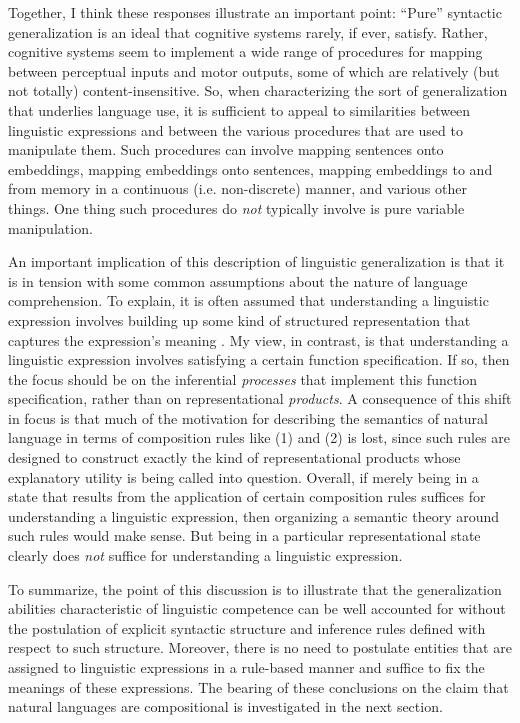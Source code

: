 Together, I think these responses illustrate an important point: ``Pure'' syntactic generalization \citep[][p. 151]{Eliasmith:2013} is an ideal that cognitive systems rarely, if ever, satisfy. Rather, cognitive systems seem to implement a wide range of procedures for mapping between perceptual inputs and motor outputs, some of which are relatively (but not totally) content-insensitive. So, when characterizing the sort of generalization that underlies language use, it is sufficient to appeal to similarities between linguistic expressions and between the various procedures that are used to manipulate them. Such procedures can involve mapping sentences onto embeddings, mapping embeddings onto sentences, mapping embeddings to and from memory in a continuous (i.e. non-discrete) manner, and various other things. One thing such procedures do \textit{not} typically involve is pure variable manipulation. 

An important implication of this description of linguistic generalization is that it is in tension with some common assumptions about the nature of language comprehension. To explain, it is often assumed that understanding a linguistic expression involves building up some kind of structured representation that captures the expression's meaning \citep[see e.g.][]{SmolenskyLegendre:2006}. My view, in contrast, is that understanding a linguistic expression involves satisfying a certain function specification. If so, then the focus should be on the inferential \textit{processes} that implement this function specification, rather than on representational \textit{products}. A consequence of this shift in focus is that much of the motivation for describing the semantics of natural language in terms of composition rules like (1) and (2) is lost, since such rules are designed to construct exactly the kind of representational products whose explanatory utility is being called into question. Overall, if merely being in a state that results from the application of certain composition rules suffices for understanding a linguistic expression, then organizing a semantic theory around such rules would make sense. But being in a particular representational state clearly does \textit{not} suffice for understanding a linguistic expression.

To summarize, the point of this discussion is to illustrate that the generalization abilities characteristic of linguistic competence can be well accounted for without the postulation of explicit syntactic structure and inference rules defined with respect to such structure. Moreover, there is no need to postulate entities that are assigned to linguistic expressions in a rule-based manner and suffice to fix the meanings of these expressions. The bearing of these conclusions on the claim that natural languages are compositional is investigated in the next section.  

